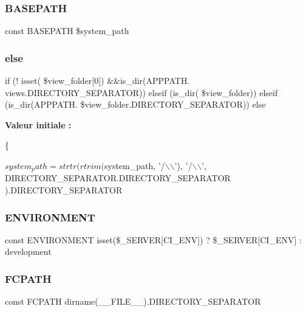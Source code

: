 \subsubsection{B\+A\+S\+E\+P\+A\+TH}
{\footnotesize\ttfamily const B\+A\+S\+E\+P\+A\+TH \$system\+\_\+path}

\mbox{\label{index_8php_ad6d2150d853feb0a6cb32263b584e456}} 
\subsubsection{else}
{\footnotesize\ttfamily if (! isset( \$view\+\_\+folder[0]) \&\&is\+\_\+dir(A\+P\+P\+P\+A\+T\+H. \textquotesingle{}views\textquotesingle{}.D\+I\+R\+E\+C\+T\+O\+R\+Y\+\_\+\+S\+E\+P\+A\+R\+A\+T\+OR)) elseif (is\+\_\+dir( \$view\+\_\+folder)) elseif (is\+\_\+dir(A\+P\+P\+P\+A\+T\+H. \$view\+\_\+folder.\+D\+I\+R\+E\+C\+T\+O\+R\+Y\+\_\+\+S\+E\+P\+A\+R\+A\+T\+OR)) else}

{\bfseries Valeur initiale \+:}
\begin{DoxyCode}
\{
        
        $system_path = strtr(
            rtrim($system_path, \textcolor{stringliteral}{'/\(\backslash\)\(\backslash\)'}),
            \textcolor{stringliteral}{'/\(\backslash\)\(\backslash\)'},
            DIRECTORY\_SEPARATOR.DIRECTORY\_SEPARATOR
        ).DIRECTORY\_SEPARATOR
\end{DoxyCode}
\mbox{\label{index_8php_a8757a57d09df5349f8b93b2083e29a1e}} 
\subsubsection{E\+N\+V\+I\+R\+O\+N\+M\+E\+NT}
{\footnotesize\ttfamily const E\+N\+V\+I\+R\+O\+N\+M\+E\+NT isset(\$\+\_\+\+S\+E\+R\+V\+ER[\textquotesingle{}C\+I\+\_\+\+E\+NV\textquotesingle{}]) ? \$\+\_\+\+S\+E\+R\+V\+ER[\textquotesingle{}C\+I\+\_\+\+E\+NV\textquotesingle{}] \+: \textquotesingle{}development\textquotesingle{}}

\mbox{\label{index_8php_ae486546e58b2603595efedf9f95b3926}} 
\subsubsection{F\+C\+P\+A\+TH}
{\footnotesize\ttfamily const F\+C\+P\+A\+TH dirname(\+\_\+\+\_\+\+F\+I\+L\+E\+\_\+\+\_\+).D\+I\+R\+E\+C\+T\+O\+R\+Y\+\_\+\+S\+E\+P\+A\+R\+A\+T\+OR}


